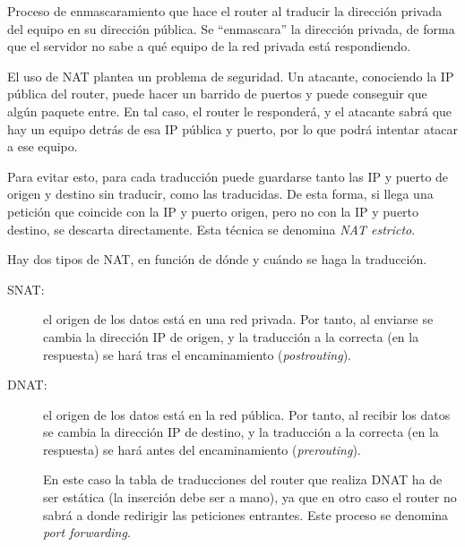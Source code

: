 \begin{definicion}
    Proceso de enmascaramiento que hace el router al traducir la dirección privada del equipo en su dirección pública. Se ``enmascara'' la dirección privada, de forma que el servidor no sabe a qué equipo de la red privada está respondiendo.
\end{definicion}

\begin{observacion}
    El uso de \acrshort{NAT} plantea un problema de seguridad. Un atacante, conociendo la IP pública del router, puede hacer un barrido de puertos y puede conseguir que algún paquete entre. En tal caso, el router le responderá, y el atacante sabrá que hay un equipo detrás de esa IP pública y puerto, por lo que podrá intentar atacar a ese equipo.
    
    Para evitar esto, para cada traducción puede guardarse tanto las IP y puerto de origen y destino sin traducir, como las traducidas. De esta forma, si llega una petición que coincide con la IP y puerto origen, pero no con la IP y puerto destino, se descarta directamente. Esta técnica se denomina \textit{NAT estricto}.
\end{observacion}


Hay dos tipos de \acrshort{NAT}, en función de dónde y cuándo se haga la traducción.
\begin{description}
    \item [\acrfull{SNAT}:] el origen de los datos está en una red privada. Por tanto, al enviarse se cambia la dirección IP de origen, y la traducción a la correcta (en la respuesta) se hará tras el encaminamiento (\textit{postrouting}).
    \item [\acrfull{DNAT}:] el origen de los datos está en la red pública. Por tanto, al recibir los datos se cambia la dirección IP de destino, y la traducción a la correcta (en la respuesta) se hará antes del encaminamiento (\textit{prerouting}).
    
    En este caso la tabla de traducciones del router que realiza \acrshort{DNAT} ha de ser estática (la inserción debe ser a mano), ya que en otro caso el router no sabrá a donde redirigir las peticiones entrantes. Este proceso se denomina \textit{port forwarding}.
\end{description}



